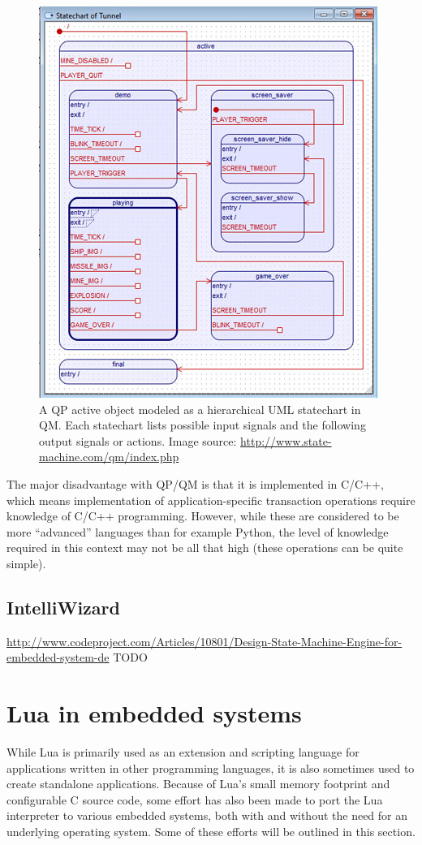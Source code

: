 \begin{figure}[h]
	\centering
	\includegraphics[scale=0.6]{img/qm_statechart.png}
	\caption[An UML statechart in QM]{A QP active object modeled as a hierarchical UML statechart in QM. Each statechart lists possible input signals and the following output signals or actions. Image source: \url{http://www.state-machine.com/qm/index.php} \label{figure:qm_statechart} }
\end{figure}

The major disadvantage with QP/QM is that it is implemented in C/C++, which means implementation of application-specific transaction operations require knowledge of C/C++ programming. However, while these are considered to be more “advanced” languages than for example Python, the level of knowledge required in this context may not be all that high (these operations can be quite simple).

\subsection{IntelliWizard}
\label{sec:intelliwizard}
\url{http://www.codeproject.com/Articles/10801/Design-State-Machine-Engine-for-embedded-system-de}
TODO

\section{Lua in embedded systems}
\label{sec:lua_in_embedded}
While Lua is primarily used as an extension and scripting language for applications written in other programming languages, it is also sometimes used to create standalone applications. Because of Lua’s small memory footprint and configurable C source code, some effort has also been made to port the Lua interpreter to various embedded systems, both with and without the need for an underlying operating system. Some of these efforts will be outlined in this section.

